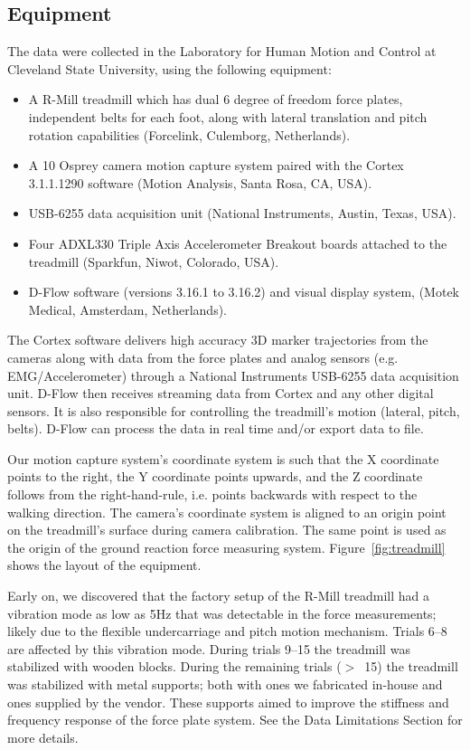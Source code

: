 \documentclass[fleqn,12pt]{wlpeerj}
\begin{document}
\subsection*{Equipment}
%
The data were collected in the Laboratory for Human Motion and Control at
Cleveland State University, using the following equipment:
%
\begin{itemize}
  \item A R-Mill treadmill which has dual 6 degree of freedom force plates,
    independent belts for each foot, along with lateral translation and pitch
    rotation capabilities (Forcelink, Culemborg, Netherlands).
  \item A 10 Osprey camera motion capture system paired with the Cortex
    3.1.1.1290 software (Motion Analysis, Santa Rosa, CA, USA).
  \item USB-6255 data acquisition unit (National Instruments, Austin, Texas,
    USA).
  \item Four ADXL330 Triple Axis Accelerometer Breakout boards attached to the
    treadmill (Sparkfun, Niwot, Colorado, USA).
  \item D-Flow software (versions 3.16.1 to 3.16.2) and visual display system,
    (Motek Medical, Amsterdam, Netherlands).
\end{itemize}

The Cortex software delivers high accuracy 3D marker trajectories from the
cameras along with data from the force plates and analog sensors (e.g.
EMG/Accelerometer) through a National Instruments USB-6255 data acquisition
unit. D-Flow then receives streaming data from Cortex and any other digital
sensors. It is also responsible for controlling the treadmill's motion
(lateral, pitch, belts). D-Flow can process the data in real time and/or export
data to file.

Our motion capture system's coordinate system is such that the X coordinate
points to the right, the Y coordinate points upwards, and the Z coordinate
follows from the right-hand-rule, i.e. points backwards with respect to the
walking direction. The camera's coordinate system is aligned to an origin point
on the treadmill's surface during camera calibration. The same point is used as
the origin of the ground reaction force measuring system.
Figure~\ref{fig:treadmill} shows the layout of the equipment.

Early on, we discovered that the factory setup of the R-Mill treadmill had a
vibration mode as low as 5\si{\hertz} that was detectable in the force
measurements; likely due to the flexible undercarriage and pitch motion
mechanism. Trials 6--8 are affected by this vibration mode. During trials 9--15
the treadmill was stabilized with wooden blocks. During the remaining trials
($>$~15) the treadmill was stabilized with metal supports; both with ones we
fabricated in-house and ones supplied by the vendor. These supports aimed to
improve the stiffness and frequency response of the force plate system. See the
Data Limitations Section for more details.
\end{document}

